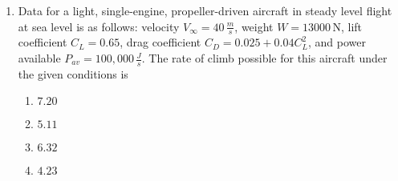 \documentclass[journal]{IEEEtran}
\begin{document}
\begin{enumerate}
\item Data for a light, single-engine, propeller-driven aircraft in steady level flight at sea level is as follows: velocity $V_{\infty} = 40 \, \frac{m}{s}$, weight $W = 13000 \, \text{N}$, lift coefficient $C_L = 0.65$, drag coefficient $C_D = 0.025 + 0.04 C_L^2$, and power available $P_{av} = 100,000 \, \frac{J}{s}$. The rate of climb possible for this aircraft under the given conditions is


\begin{enumerate}
    \item $7.20$
    \item $5.11$
    \item $6.32$
    \item $4.23$
\end{enumerate}






\end{enumerate}
\end{document}
